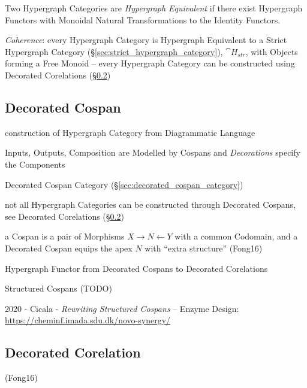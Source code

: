 Two Hypergraph Categories are \emph{Hypergraph Equivalent} if there
exist Hypergraph Functors with Monoidal Natural Transformations to the
Identity Functors.

\emph{Coherence}: every Hypergraph Category is Hypergraph Equivalent
to a Strict Hypergraph Category
(\S\ref{sec:strict_hypergraph_category}), $\cat{H}_{str}$, with
Objects forming a Free Monoid -- every Hypergraph Category can be
constructed using Decorated Corelations
(\S\ref{sec:decorated_corelation})



\subsection{Decorated Cospan}\label{sec:decorated_cospan}

construction of Hypergraph Category from Diagrammatic Language

Inputs, Outputs, Composition are Modelled by Cospans and
\emph{Decorations} specify the Components

Decorated Cospan Category (\S\ref{sec:decorated_cospan_category})

not all Hypergraph Categories can be constructed through Decorated
Cospans, see Decorated Corelations (\S\ref{sec:decorated_corelation})

a Cospan is a pair of Morphisms $X \rightarrow N \leftarrow Y$ with a
common Codomain, and a Decorated Cospan equips the apex $N$ with
``extra structure'' (Fong16) %

Hypergraph Functor from Decorated Cospans to Decorated Corelations

Structured Cospans (TODO)

2020 - Cicala - \emph{Rewriting Structured Cospans} -- Enzyme Design:
\url{https://cheminf.imada.sdu.dk/novo-synergy/}



\subsection{Decorated Corelation}\label{sec:decorated_corelation}

(Fong16)

